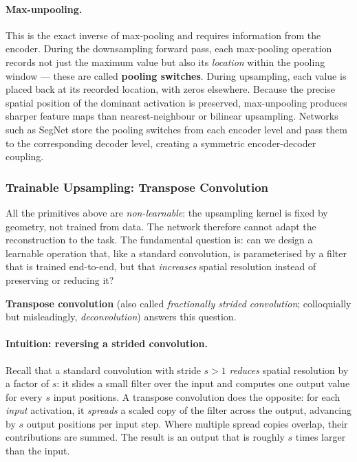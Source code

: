 \documentclass[11pt,a4paper]{article}
\newcommand{\term}[1]{\textcolor{DefGreen}{\textbf{#1}}\index{#1}}
\begin{document}
\paragraph{Max-unpooling.}
This is the exact inverse of max-pooling and requires information from the encoder. During the downsampling forward pass, each max-pooling operation records not just the maximum value but also its \emph{location} within the pooling window — these are called \textbf{pooling switches}. During upsampling, each value is placed back at its recorded location, with zeros elsewhere. Because the precise spatial position of the dominant activation is preserved, max-unpooling produces sharper feature maps than nearest-neighbour or bilinear upsampling. Networks such as SegNet store the pooling switches from each encoder level and pass them to the corresponding decoder level, creating a symmetric encoder-decoder coupling.

\subsubsection{Trainable Upsampling: Transpose Convolution}

All the primitives above are \emph{non-learnable}: the upsampling kernel is fixed by geometry, not trained from data. The network therefore cannot adapt the reconstruction to the task. The fundamental question is: can we design a learnable operation that, like a standard convolution, is parameterised by a filter that is trained end-to-end, but that \emph{increases} spatial resolution instead of preserving or reducing it?

\term{Transpose convolution} (also called \emph{fractionally strided convolution}; colloquially but misleadingly, \emph{deconvolution}) answers this question.

\paragraph{Intuition: reversing a strided convolution.}
Recall that a standard convolution with stride $s>1$ \emph{reduces} spatial resolution by a factor of $s$: it slides a small filter over the input and computes one output value for every $s$ input positions. A transpose convolution does the opposite: for each \emph{input} activation, it \emph{spreads} a scaled copy of the filter across the output, advancing by $s$ output positions per input step. Where multiple spread copies overlap, their contributions are summed. The result is an output that is roughly $s$ times larger than the input.
\end{document}
